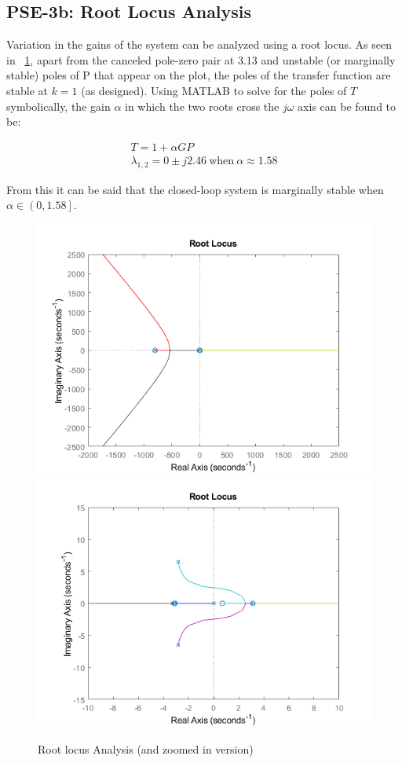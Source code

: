 \documentclass[]{article}
\begin{document}
	\subsection{PSE-3b: Root Locus Analysis}
		Variation in the gains of the system can be analyzed using a root locus. As seen in \figurename \ \ref{fig:rlocus}, apart from the canceled pole-zero pair at 3.13 and unstable (or marginally stable) poles of P that appear on the plot, the poles of the transfer function are stable at $k=1$ (as designed). Using MATLAB to solve for the poles of $T$ symbolically, the gain $\alpha$ in which the two roots cross the $j\omega$ axis can be found to be:
		
		\begin{equation}
			\begin{aligned}
				T = 1 + \alpha G P\\
				\lambda_{1,2} = 0 \pm j 2.46 \ \text{when} \ \alpha \approx 1.58
			\end{aligned}
		\end{equation}
		
		From this it can be said that the closed-loop system is marginally stable when $\alpha \in \left(0,1.58\right]$.
		
		
		\begin{figure}[p]
			\centering
			\includegraphics[width=0.7\linewidth]{Fig/PSE_rlocus_full}\\
			\includegraphics[width=0.7\linewidth]{Fig/PSE_rlocus_zoomed}
			\caption{Root locus Analysis (and zoomed in version)}
			\label{fig:rlocus}
		\end{figure}
		
\end{document}
